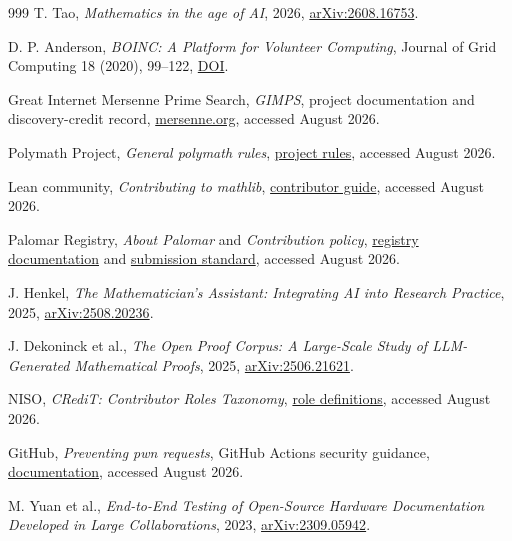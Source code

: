 \documentclass[10pt]{article}
\begin{document}
\begin{thebibliography}{999}
T. Tao, \emph{Mathematics in the age of AI}, 2026,
\href{https://arxiv.org/abs/2608.16753}{arXiv:2608.16753}.

D. P. Anderson, \emph{BOINC: A Platform for Volunteer Computing}, Journal of
Grid Computing 18 (2020), 99--122,
\href{https://doi.org/10.1007/s10723-019-09497-9}{DOI}.

Great Internet Mersenne Prime Search, \emph{GIMPS}, project documentation and
discovery-credit record, \href{https://www.mersenne.org/}{mersenne.org},
accessed August 2026.

Polymath Project, \emph{General polymath rules},
\href{https://polymathprojects.org/general-polymath-rules/}{project rules},
accessed August 2026.

Lean community, \emph{Contributing to mathlib},
\href{https://leanprover-community.github.io/contribute/index.html}{contributor guide},
accessed August 2026.

Palomar Registry, \emph{About Palomar} and \emph{Contribution policy},
\href{https://palomar-registry.org/about}{registry documentation} and
\href{https://github.com/PalomarRegistry/PalomarPolicy/blob/main/CONTRIBUTING.md}{submission standard},
accessed August 2026.

J. Henkel, \emph{The Mathematician's Assistant: Integrating AI into Research
Practice}, 2025,
\href{https://arxiv.org/abs/2508.20236}{arXiv:2508.20236}.

J. Dekoninck et al., \emph{The Open Proof Corpus: A Large-Scale Study of
LLM-Generated Mathematical Proofs}, 2025,
\href{https://arxiv.org/abs/2506.21621}{arXiv:2506.21621}.

NISO, \emph{CRediT: Contributor Roles Taxonomy},
\href{https://credit.niso.org/contributor-roles-defined/}{role definitions},
accessed August 2026.

GitHub, \emph{Preventing pwn requests}, GitHub Actions security guidance,
\href{https://docs.github.com/en/actions/reference/security/secure-use}{documentation},
accessed August 2026.

M. Yuan et al., \emph{End-to-End Testing of Open-Source Hardware Documentation
Developed in Large Collaborations}, 2023,
\href{https://arxiv.org/abs/2309.05942}{arXiv:2309.05942}.

\end{thebibliography}
\end{document}
